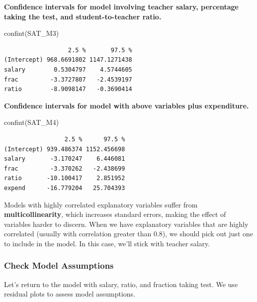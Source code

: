 \documentclass[
  letterpaper,
  DIV=11,
  numbers=noendperiod]{scrreprt}
\newenvironment{Shaded}{\begin{snugshade}}{\end{snugshade}}
\newcommand{\FunctionTok}[1]{\textcolor[rgb]{0.28,0.35,0.67}{#1}}
\newcommand{\NormalTok}[1]{\textcolor[rgb]{0.00,0.23,0.31}{#1}}
\begin{document}
\textbf{Confidence intervals for model involving teacher salary,
percentage taking the test, and student-to-teacher ratio.}

\begin{Shaded}
\begin{Highlighting}[]
\FunctionTok{confint}\NormalTok{(SAT\_M3)}
\end{Highlighting}
\end{Shaded}

\begin{verbatim}
                  2.5 %       97.5 %
(Intercept) 968.6691802 1147.1271438
salary        0.5304797    4.5744605
frac         -3.3727807   -2.4539197
ratio        -8.9098147   -0.3690414
\end{verbatim}

\textbf{Confidence intervals for model with above variables plus
expenditure.}

\begin{Shaded}
\begin{Highlighting}[]
\FunctionTok{confint}\NormalTok{(SAT\_M4)}
\end{Highlighting}
\end{Shaded}

\begin{verbatim}
                 2.5 %      97.5 %
(Intercept) 939.486374 1152.456698
salary       -3.170247    6.446081
frac         -3.370262   -2.438699
ratio       -10.100417    2.851952
expend      -16.779204   25.704393
\end{verbatim}

Models with highly correlated explanatory variables suffer from
\textbf{multicollinearity}, which increases standard errors, making the
effect of variables harder to discern. When we have explanatory
variables that are highly correlated (usually with correlation greater
than 0.8), we should pick out just one to include in the model. In this
case, we'll stick with teacher salary.

\subsubsection{Check Model Assumptions}\label{check-model-assumptions}

Let's return to the model with salary, ratio, and fraction taking test.
We use residual plots to assess model assumptions.
\end{document}
